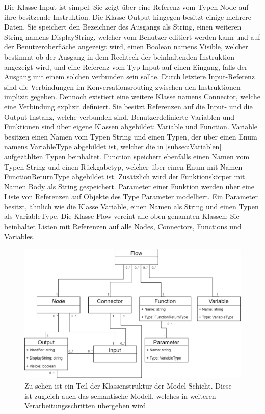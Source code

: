 Die Klasse Input ist simpel: Sie zeigt über eine Referenz vom Typen Node auf ihre besitzende Instruktion. Die Klasse Output hingegen besitzt einige mehrere Daten. Sie speichert den Bezeichner des Ausgangs als String, einen weiteren String namens DisplayString, welcher vom Benutzer editiert werden kann und auf der Benutzeroberfläche angezeigt wird, einen Boolean namens Visible, welcher bestimmt ob der Ausgang in dem Rechteck der beinhaltenden Instruktion angezeigt wird, und eine Referenz vom Typ Input auf einen Eingang, falls der Ausgang mit einem solchen verbunden sein sollte. Durch letztere Input-Referenz sind die Verbindungen im Konversationsrouting zwischen den Instruktionen implizit gegeben. Dennoch existiert eine weitere Klasse namens Connector, welche eine Verbindung explizit definiert. Sie besitzt Referenzen auf die Input- und die Output-Instanz, welche verbunden sind.
\newline
Benutzerdefinierte Variablen und Funktionen sind über eigene Klassen abgebildet: Variable und Function. Variable besitzen einen Namen vom Typen String und einen Typen, der über einen Enum namens VariableType abgebildet ist, welcher die in \ref{subsec:Variablen} aufgezählten Typen beinhaltet. Function speichert ebenfalls einen Namen vom Typen String und einen Rückgabetyp, welcher über einen Enum mit Namen FunctionReturnType abgebildet ist. Zusätzlich wird der Funktionskörper mit Namen Body als String gespeichert. Parameter einer Funktion werden über eine Liste von Referenzen auf Objekte des Type Parameter modelliert. Ein Parameter besitzt, ähnlich wie die Klasse Variable, einen Namen als String und einen Typen als VariableType. Die Klasse Flow vereint alle oben genannten Klassen: Sie beinhaltet Listen mit Referenzen auf alle Nodes, Connectors, Functions und Variables. 

\begin{figure} %
	\centering
		\includegraphics[width=\textwidth]{img/FlowClassStructure.png}
	\caption[Klassenstruktur der Model-Schicht]{Zu sehen ist ein Teil der Klassenstruktur der Model-Schicht. Diese ist zugleich auch das semantische Modell, welches in weiteren Verarbeitungsschritten übergeben wird.}
	\label{fig:UML:Model-Schicht}
\end{figure}

